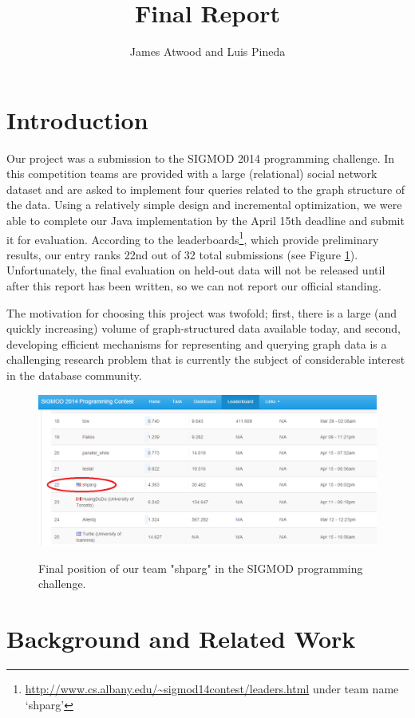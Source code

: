 \documentclass{article}
\title{Final Report}
\author{
James Atwood and Luis Pineda \\ %
}
\begin{document}
\maketitle

\section{Introduction}
Our project was a submission to the SIGMOD 2014 programming challenge. 
In this competition teams are provided with a large (relational) social network
dataset and are asked to implement four queries related to the graph
structure of the data.  Using a relatively simple design and
incremental optimization, we were able to complete our Java
implementation by the April 15th deadline and submit it for
evaluation.  According to the
leaderboards\footnote{\url{http://www.cs.albany.edu/~sigmod14contest/leaders.html} under team name `shparg'},
which provide preliminary results, our entry ranks 22nd out of 32
total submissions (see Figure \ref{fig:leader}).  Unfortunately, the final evaluation on held-out
data will not be released until after this report has been written, so
we can not report our official standing.

The motivation for choosing this project was
twofold; first, there is a large (and quickly increasing) volume of
graph-structured data available today, and second, developing
efficient mechanisms for representing and querying graph data is a
challenging research problem that is currently the subject of
considerable interest in the database community.

\begin{figure}[t]
  \centering
  \includegraphics[scale=0.45]{img/leaderboard.png}
  \label{fig:leader}
  \caption{Final position of our team "shparg" in the SIGMOD programming challenge.}
\end{figure}

\section{Background and Related Work}
\end{document}
